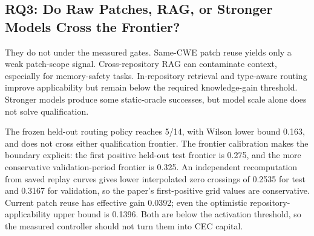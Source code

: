 ﻿\documentclass[lettersize,journal]{IEEEtran}
\begin{document}
\begin{table}[!t]
\caption{Operating-curve selected points versus fixed strict reference}
\label{tab:lxxxi_operating_selection}
\centering
\scriptsize
\renewcommand{\arraystretch}{1.15}
\end{table}

\subsection{RQ3: Do Raw Patches, RAG, or Stronger Models Cross the Frontier?}
They do not under the measured gates. Same-CWE patch reuse yields only a weak patch-scope signal. Cross-repository RAG can contaminate context, especially for memory-safety tasks. In-repository retrieval and type-aware routing improve applicability but remain below the required knowledge-gain threshold. Stronger models produce some static-oracle successes, but model scale alone does not solve qualification.

The frozen held-out routing policy reaches 5/14, with Wilson lower bound 0.163, and does not cross either qualification frontier. The frontier calibration makes the boundary explicit: the first positive held-out test frontier is 0.275, and the more conservative validation-period frontier is 0.325. An independent recomputation from saved replay curves gives lower interpolated zero crossings of 0.2535 for test and 0.3167 for validation, so the paper's first-positive grid values are conservative. Current patch reuse has effective gain 0.0392; even the optimistic repository-applicability upper bound is 0.1396. Both are below the activation threshold, so the measured controller should not turn them into CEC capital.
\end{document}
